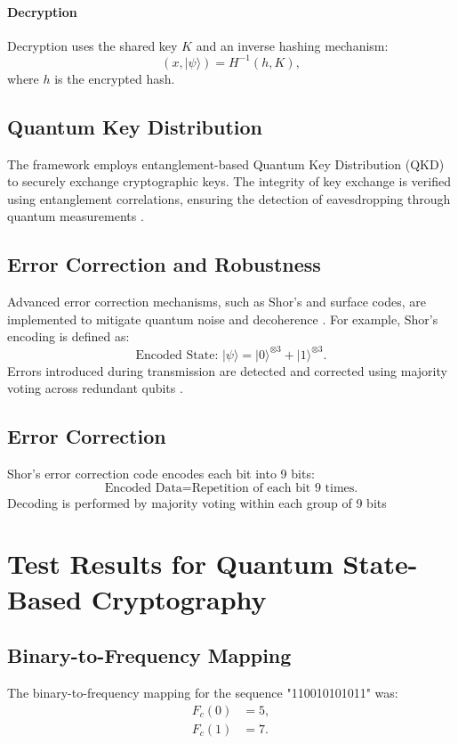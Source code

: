 \documentclass{article}
\theoremstyle{plain}
\begin{document}
\paragraph{Decryption}
Decryption uses the shared key \( K \) and an inverse hashing mechanism:
\begin{equation}
(x, |\psi\rangle) = H^{-1}(h, K),
\end{equation}
where \( h \) is the encrypted hash.

\subsection{Quantum Key Distribution}
The framework employs entanglement-based Quantum Key Distribution (QKD) to securely exchange cryptographic keys. The integrity of key exchange is verified using entanglement correlations, ensuring the detection of eavesdropping through quantum measurements \cite{bennett1984quantum, ekert1991quantum}.

\subsection{Error Correction and Robustness}
Advanced error correction mechanisms, such as Shor's and surface codes, are implemented to mitigate quantum noise and decoherence \cite{shor1995scheme}. For example, Shor's encoding is defined as:
\begin{equation}
\text{Encoded State: } |\psi\rangle = |0\rangle^{\otimes 3} + |1\rangle^{\otimes 3}.
\end{equation}
Errors introduced during transmission are detected and corrected using majority voting across redundant qubits \cite{feynman1982simulating}.

\subsection{Error Correction}
Shor's error correction code encodes each bit into 9 bits:
\begin{equation}
\text{Encoded Data} = \text{Repetition of each bit 9 times.}
\end{equation}
Decoding is performed by majority voting within each group of 9 bits

\section{Test Results for Quantum State-Based Cryptography}

\subsection{Binary-to-Frequency Mapping}
The binary-to-frequency mapping for the sequence "110010101011" was:
\begin{align*}
F_c(0) &= 5, \\
F_c(1) &= 7.
\end{align*}
\end{document}

